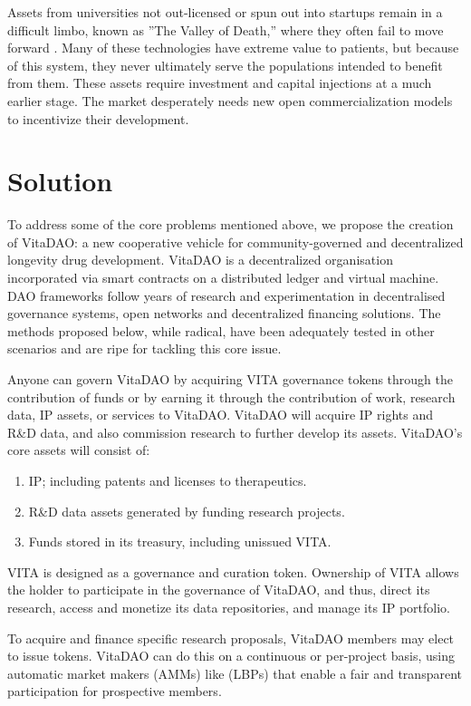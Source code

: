 \documentclass[12pt,letterpaper]{article}
\begin{document}
Assets from universities not out-licensed or spun out into startups remain in a difficult limbo, known as ”The Valley of Death,” where they often fail to move forward \citep{Seyhan2019}. Many of these technologies have extreme value to patients, but because of this system, they never ultimately serve the populations intended to benefit from them. These assets require investment and capital injections at a much earlier stage. The market desperately needs new open commercialization models to incentivize their development. 

\section{Solution}
To address some of the core problems mentioned above, we propose the creation of VitaDAO: a new cooperative vehicle for community-governed and decentralized longevity drug development. VitaDAO is a decentralized organisation incorporated via smart contracts on a distributed ledger and virtual machine. DAO frameworks follow years of research and experimentation in decentralised governance systems, open networks and decentralized financing solutions. The methods proposed below, while radical, have been adequately tested in other scenarios and are ripe for tackling this core issue.

Anyone can govern VitaDAO by acquiring VITA governance tokens through the contribution of funds or by earning it through the contribution of work, research data, IP assets, or services to VitaDAO. VitaDAO will acquire IP rights and R\&D data, and also commission research to further develop its assets. VitaDAO’s core assets will consist of: 

\begin{enumerate}
\item IP; including patents and licenses to therapeutics. 
\item R\&D data assets generated by funding research projects. 
\item Funds stored in its treasury, including unissued VITA.
\end{enumerate}

VITA is designed as a governance and curation token. Ownership of VITA allows the holder to participate in the governance of VitaDAO, and thus, direct its research, access and monetize its data repositories, and manage its IP portfolio.

To acquire and finance specific research proposals, VitaDAO members may elect to issue tokens. VitaDAO can do this on a continuous or per-project basis, using automatic market makers (AMMs) like  (LBPs) that enable a fair and transparent participation for prospective members. 
\end{document}

